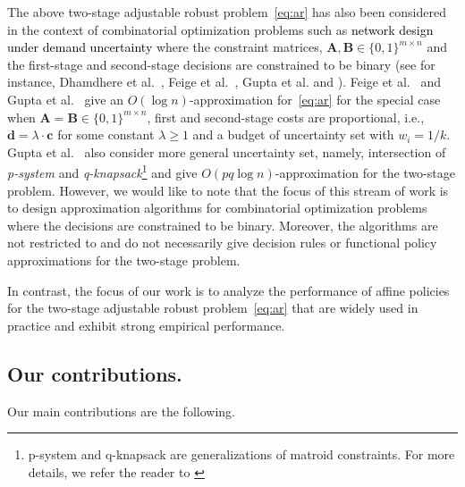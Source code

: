 \documentclass[moor]{informs1}              %
\newcommand{\mb}[1]{\ensuremath{\boldsymbol{#1}}}
\newcommand*{\red}{\textcolor{black}}
\begin{document}
The above two-stage adjustable robust problem~\eqref{eq:ar} has also been considered in the context of combinatorial optimization problems such as  \red{network design under demand uncertainty} where the constraint matrices, $\mb A, \mb B \in \{0,1\}^{m \times n}$ and the first-stage and second-stage decisions are constrained to be binary (see for instance, Dhamdhere et al.~\cite{dhamdhere2005pay}, Feige et al.~\cite{FJMM07}, Gupta et al. \cite{gupta2014thresholded} and \cite{gupta2016robust}). Feige et al.~\cite{FJMM07} and Gupta et al.~\cite{gupta2014thresholded} give an $O(\log n)$-approximation for~\eqref{eq:ar} for the special case when $\mb A = \mb B \in \{0,1\}^{m \times n}$, first and second-stage costs are proportional, i.e., $\mb d = \lambda \cdot \mb c$ for some constant $\lambda \geq 1$ and a budget of uncertainty set with $w_i = 1/k$. Gupta et al.~\cite{gupta2016robust} also consider more general uncertainty set, namely, intersection of  {\em p-system} and {\em q-knapsack}\footnote{p-system and  q-knapsack are generalizations of matroid constraints. For more details, we refer the reader to \cite{gupta2016robust}} and give $O(pq\log n)$-approximation for the two-stage problem. However, we would like to note that the focus of this stream of work is to design approximation algorithms for combinatorial optimization problems where the decisions are constrained to be binary. Moreover, the algorithms are not restricted to and do not necessarily give decision rules or functional policy approximations for the two-stage problem. 

In contrast, the focus of our work is to analyze the performance of affine policies for the two-stage adjustable robust problem~\eqref{eq:ar} that are widely used in practice and exhibit strong empirical performance. 

 \subsection{Our contributions.} Our main contributions are the following.
\end{document}
